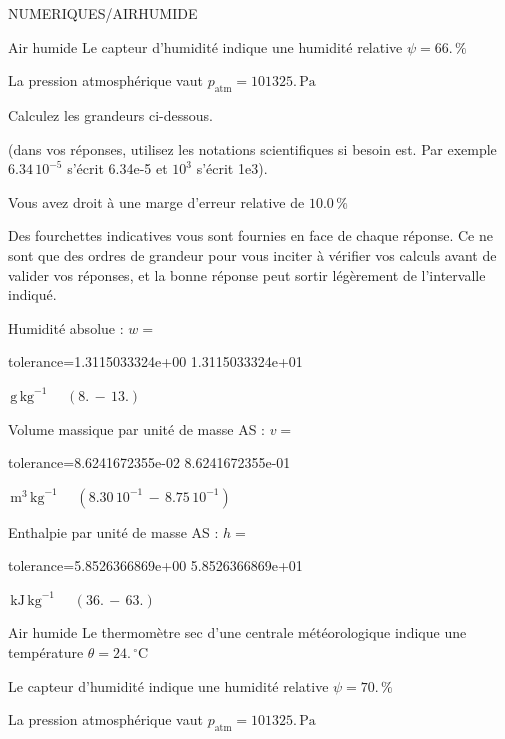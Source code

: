 \documentclass[12pt]{article}
\begin{document}
\begin{quiz}{NUMERIQUES/AIRHUMIDE}
\begin{cloze}{Air humide}
Le capteur d'humidité indique une humidité relative $\psi = 66.\, \% $

La pression atmosphérique vaut $p_{\text{atm}} = 101325.\,  \mathrm{Pa} $

 

Calculez les grandeurs ci-dessous.

(dans vos réponses, utilisez les notations scientifiques si besoin est. Par exemple $6.34\, 10^{-5}$ s'écrit 6.34e-5 et $10^{3}$ s'écrit 1e3).

Vous avez droit à une marge d'erreur relative de $10.0\, \% $

Des fourchettes indicatives vous sont fournies en face de chaque réponse. Ce ne sont que des ordres de grandeur pour vous inciter à vérifier vos calculs avant de valider vos réponses, et la bonne réponse peut sortir légèrement de l'intervalle indiqué.

Humidité absolue : $w =  $
\begin{numerical}[points=1] 
\item[tolerance={1.3115033324e+00}] 1.3115033324e+01 
\end{numerical} 
 $\,  \mathrm{g}\,  \mathrm{kg}^{-1}$ 
 $ \quad (8. \, - \, 13.) $ 

Volume massique par unité de masse AS : $v =  $
\begin{numerical}[points=1] 
\item[tolerance={8.6241672355e-02}] 8.6241672355e-01 
\end{numerical} 
 $\,  \mathrm{m}^{3}\,  \mathrm{kg}^{-1}$ 
 $ \quad ( 8.30 \, 10^{-1}  \, - \,  8.75 \, 10^{-1} ) $ 

Enthalpie par unité de masse AS : $h =  $
\begin{numerical}[points=2] 
\item[tolerance={5.8526366869e+00}] 5.8526366869e+01 
\end{numerical} 
 $\,  \mathrm{kJ}\,  \mathrm{kg}^{-1}$ 
 $ \quad (36. \, - \, 63.) $ 

\end{cloze} 


 \begin{cloze}{Air humide} 
Le thermomètre sec d’une centrale météorologique indique une température $\theta = 24.\,  \mathrm{^\circ\mathrm{C}} $

Le capteur d'humidité indique une humidité relative $\psi = 70.\, \% $

La pression atmosphérique vaut $p_{\text{atm}} = 101325.\,  \mathrm{Pa} $


\end{cloze}
\end{quiz}
\end{document}
